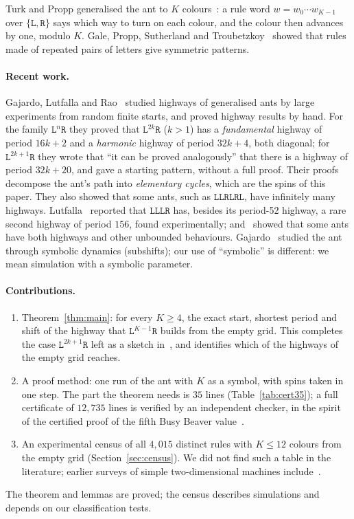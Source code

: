 \documentclass[11pt,a4paper]{article}
\theoremstyle{definition}
\theoremstyle{remark}
\newcommand{\Lw}{\mathtt{L}}
\newcommand{\Rw}{\mathtt{R}}
\begin{document}
Turk and Propp generalised the ant to $K$ colours~\cite{dewdney,gale1995,gale1998}: a rule word
$w = w_0 \cdots w_{K-1}$ over $\{\Lw,\Rw\}$ says which way to turn on each colour, and the colour then
advances by one, modulo $K$. Gale, Propp, Sutherland and Troubetzkoy~\cite{gale1995} showed that rules made of
repeated pairs of letters give symmetric patterns.

\paragraph{Recent work.} Gajardo, Lutfalla and Rao~\cite{glr} studied highways of generalised ants by
large experiments from random finite starts, and proved highway results by hand. For the family
$\Lw^{n}\Rw$ they proved that $\Lw^{2k}\Rw$ ($k > 1$) has a \emph{fundamental} highway of period $16k+2$ and
a \emph{harmonic} highway of period $32k+4$, both diagonal; for $\Lw^{2k+1}\Rw$ they wrote that ``it can be
proved analogously'' that there is a highway of period $32k+20$, and gave a starting pattern, without a full
proof. Their proofs decompose the ant's path into \emph{elementary cycles}, which are the spins of this paper.
They also showed that some ants, such as $\Lw\Lw\Rw\Lw\Rw\Lw$, have infinitely many highways.
Lutfalla~\cite{lutfalla-lllr} reported that $\Lw\Lw\Lw\Rw$ has, besides its period-52 highway, a rare second
highway of period $156$, found experimentally; and~\cite{lutfalla-sideways} showed that some ants have both
highways and other unbounded behaviours. Gajardo~\cite{gajardo2003} studied the ant through symbolic
dynamics (subshifts); our use of ``symbolic'' is different: we mean simulation with a symbolic parameter.

\paragraph{Contributions.}
\begin{enumerate}[nosep]
\item Theorem~\ref{thm:main}: for every $K \ge 4$, the exact start, shortest period and shift of the
highway that $\Lw^{K-1}\Rw$ builds from the empty grid. This completes the case $\Lw^{2k+1}\Rw$ left as a
sketch in~\cite{glr}, and identifies which of the highways of~\cite{glr} the empty grid reaches.
\item A proof method: one run of the ant with $K$ as a symbol, with spins taken in one step. The part the
theorem needs is $35$ lines (Table~\ref{tab:cert35}); a full certificate of $12{,}735$ lines is verified by
an independent checker, in the spirit of the certified proof of the fifth Busy Beaver value~\cite{bb5}.
\item An experimental census of all $4{,}015$ distinct rules with $K \le 12$ colours from the empty grid
(Section~\ref{sec:census}). We did not find such a table in the literature; earlier surveys of simple
two-dimensional machines include~\cite{nks}.
\end{enumerate}
The theorem and lemmas are proved; the census describes simulations and depends on our classification
tests.
\end{document}
